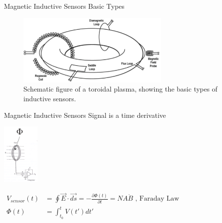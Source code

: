 \documentclass{beamer}
\begin{document}
\begin{frame}{Magnetic Inductive Sensors } {Basic Types}
	\begin{figure}[ht]
 	\begin{center}
	\includegraphics[height=3.5cm]{indsensors.png}
		\caption{\tiny Schematic figure of a toroidal plasma, showing the basic types of inductive sensors.}
	\end{center}
	\end{figure}
\end{frame}

\begin{frame}{Magnetic Inductive Sensors } {Signal is a time derivative }
 	\begin{center}
	\includegraphics[trim = 1mm 25mm 3mm 5mm, clip, height=3cm]{magsensor.png}
	\end{center}
$
 \begin{array}{cl}
 V_{sensor} (t) &= \oint \vec{E} \cdot \vec{d s}  =
  - \frac{\partial \Phi(t)}{\partial t} = NA\dot {B}\textrm{ , Faraday Law} \\
\Phi(t) &= \int_{t_0}^t V(t') d t'
\end{array}
$

\end{frame}
\end{document}
